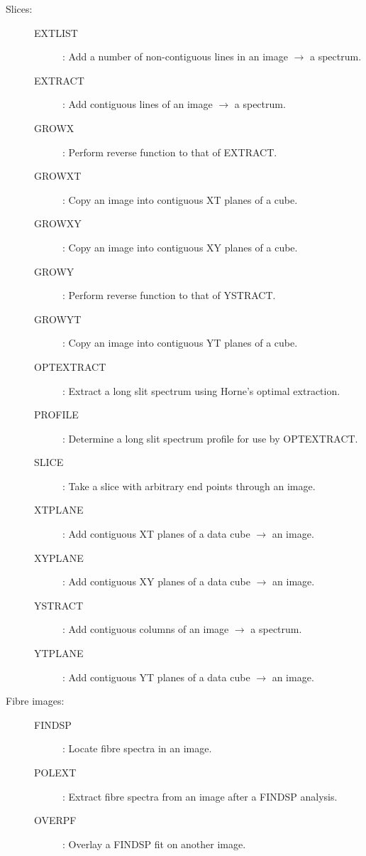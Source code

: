 \begin {description}
\begin{description}
\item [Slices:]
\begin{description}
\item [EXTLIST]: Add a number of non-contiguous lines in an image $\rightarrow$  a spectrum.
\item [EXTRACT]: Add contiguous lines of an image $\rightarrow$  a spectrum.
\item [GROWX]: Perform reverse function to that of EXTRACT.
\item [GROWXT]: Copy an image into contiguous XT planes of a cube.
\item [GROWXY]: Copy an image into contiguous XY planes of a cube.
\item [GROWY]: Perform reverse function to that of YSTRACT.
\item [GROWYT]: Copy an image into contiguous YT planes of a cube.
\item [OPTEXTRACT]: Extract a long slit spectrum using Horne's optimal extraction.
\item [PROFILE]: Determine a long slit spectrum profile for use by OPTEXTRACT.
\item [SLICE]: Take a slice with arbitrary end points through an image.
\item [XTPLANE]: Add contiguous XT planes of a data cube $\rightarrow$  an image.
\item [XYPLANE]: Add contiguous XY planes of a data cube $\rightarrow$  an image.
\item [YSTRACT]: Add contiguous columns of an image $\rightarrow$  a spectrum.
\item [YTPLANE]: Add contiguous YT planes of a data cube $\rightarrow$  an image.
\end{description}

\item [Fibre images:]
\begin{description}
\item [FINDSP]: Locate fibre spectra in an image.
\item [POLEXT]: Extract fibre spectra from an image after a FINDSP analysis.
\item [OVERPF]: Overlay a FINDSP fit on another image.
\end{description}
\end{description}

\item [SPECTROMETERS ---]


\end{description}
